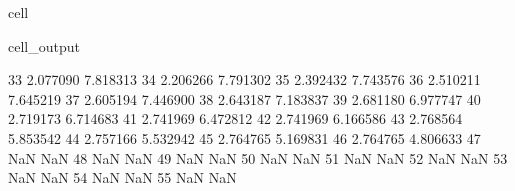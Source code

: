 \documentclass[letterpaper,10pt,english]{jupyterBook}
\begin{document}
\begin{sphinxuseclass}{cell}
\begin{sphinxVerbatimOutput}
\begin{sphinxuseclass}{cell_output}
\begin{sphinxVerbatim}[commandchars=\\\{\}]
					33                2.077090                    \PYGZhy{}7.818313   
					34                2.206266                    \PYGZhy{}7.791302   
					35                2.392432                    \PYGZhy{}7.743576   
					36                2.510211                    \PYGZhy{}7.645219   
					37                2.605194                    \PYGZhy{}7.446900   
					38                2.643187                    \PYGZhy{}7.183837   
					39                2.681180                    \PYGZhy{}6.977747   
					40                2.719173                    \PYGZhy{}6.714683   
					41                2.741969                    \PYGZhy{}6.472812   
					42                2.741969                    \PYGZhy{}6.166586   
					43                2.768564                    \PYGZhy{}5.853542   
					44                2.757166                    \PYGZhy{}5.532942   
					45                2.764765                    \PYGZhy{}5.169831   
					46                2.764765                    \PYGZhy{}4.806633   
					47                     NaN                          NaN   
					48                     NaN                          NaN   
					49                     NaN                          NaN   
					50                     NaN                          NaN   
					51                     NaN                          NaN   
					52                     NaN                          NaN   
					53                     NaN                          NaN   
					54                     NaN                          NaN   
					55                     NaN                          NaN   
					

\end{sphinxVerbatim}
\end{sphinxuseclass}
\end{sphinxVerbatimOutput}
\end{sphinxuseclass}
\end{document}
